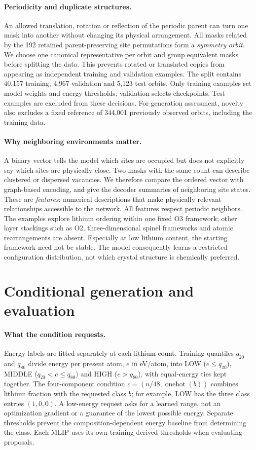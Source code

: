 \documentclass{article}
\begin{document}
\paragraph{Periodicity and duplicate structures.}
An allowed translation, rotation or reflection of the periodic parent can turn one mask into
another without changing its physical arrangement. All masks related by the
192 retained parent-preserving site permutations form a \emph{symmetry orbit}.
We choose one canonical representative per orbit and group equivalent masks
before splitting the data. This prevents rotated or translated copies from
appearing as independent training and validation examples. The split contains
40,157 training, 4,967 validation and 5,123 test orbits. Only training examples
set model weights and energy thresholds; validation selects checkpoints. Test
examples are excluded from these decisions. For generation assessment, novelty
also excludes a fixed reference of 344,001 previously observed orbits, including
the training data.

\paragraph{Why neighboring environments matter.}
A binary vector tells the model which sites are occupied but does not explicitly
say which sites are physically close. Two masks with the same count can describe
clustered or dispersed vacancies. We therefore compare the ordered vector with
graph-based encoding, and give the decoder summaries of neighboring site states.
These are \emph{features}: numerical descriptions that make physically relevant
relationships accessible to the network. All features respect periodic neighbors.
The examples explore lithium ordering within one fixed O3 framework; other
layer stackings such as O2, three-dimensional spinel frameworks and atomic
rearrangements are absent. Especially at low lithium content, the starting
framework need not be stable. The model consequently learns a restricted
configuration distribution, not which crystal structure is chemically preferred.

\section{Conditional generation and evaluation}
\paragraph{What the condition requests.}
Energy labels are fitted separately at each lithium count. Training quantiles
$q_{20}$ and $q_{80}$ divide energy per present atom, $e$ in eV/atom, into
LOW ($e\le q_{20}$), MIDDLE ($q_{20}<e\le q_{80}$) and HIGH
($e>q_{80}$), with equal-energy ties kept together. The four-component condition
$c=(n/48,\operatorname{onehot}(b))$ combines lithium fraction with the requested
class $b$; for example, LOW has the three class entries $(1,0,0)$.
A low-energy request asks for a learned range, not an optimization gradient or
a guarantee of the lowest possible energy. Separate thresholds prevent the
composition-dependent energy baseline from determining the class. Each MLIP
uses its own training-derived thresholds when evaluating proposals.
\end{document}
